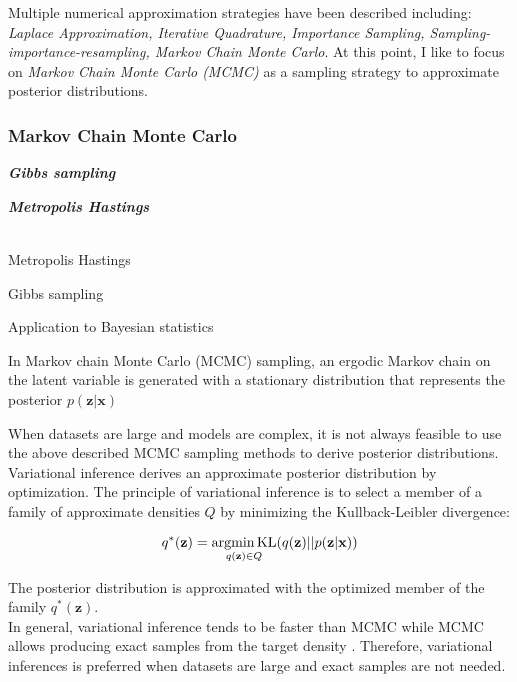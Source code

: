 Multiple numerical approximation strategies have been described including: \emph{Laplace Approximation, Iterative Quadrature, Importance Sampling, Sampling-importance-resampling, Markov Chain Monte Carlo}. At this point, I like to focus on \emph{Markov Chain Monte Carlo (MCMC)} as a sampling strategy to approximate posterior distributions.

\subsubsection{Markov Chain Monte Carlo}

\textbf{\textit{Gibbs sampling}}

\textbf{\textit{Metropolis Hastings}}

\\

Metropolis Hastings \citep{Metropolis1953, Hastings1970}

Gibbs sampling \citep{Geman1984}

Application to Bayesian statistics \citep{Gelfand1990}

In Markov chain Monte Carlo (MCMC) sampling, an ergodic Markov chain on the latent variable is generated with a stationary distribution that represents the posterior $p(\mathbf{z}|\mathbf{x})$  


When datasets are large and models are complex, it is not always feasible to use the above described MCMC sampling methods to derive posterior distributions. Variational inference derives an approximate posterior distribution by optimization. The principle of variational inference is to select a member of a family of approximate densities $Q$ by minimizing the Kullback-Leibler divergence:

\begin{equation}
q^\ast(\mathbf{z})=\underset{q(\mathbf{z})\in{}Q}{\textnormal{argmin\,{}KL}}(q(\mathbf{z})||p(\mathbf{z}|\mathbf{x}))
\end{equation}

The posterior distribution is approximated with the optimized member of the family $q^\ast(\mathbf{z})$\citep{Blei2017}.\\
In general, variational inference tends to be faster than MCMC while MCMC allows producing exact samples from the target density \citep{Blei2017}. Therefore, variational inferences is preferred when datasets are large and exact samples are not needed.

